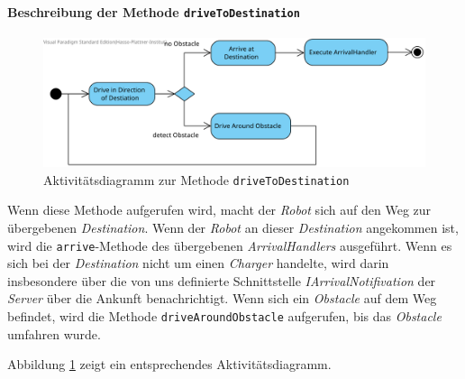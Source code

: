 			\paragraph{Beschreibung der Methode \texttt{driveToDestination}}
			\begin{figure}[H]
			\centering
			\includegraphics[width=1\textwidth]{img/1-Entwurf-7-1-methode_driveAroundObstacle}
			\caption{Aktivitätsdiagramm zur Methode \texttt{driveToDestination}}
			\label{AktivitaetDriveToDestination}
			\end{figure}

			Wenn diese Methode aufgerufen wird, macht der \textit{Robot} sich auf den Weg zur 
			übergebenen \textit{Destination}. Wenn der \textit{Robot} an dieser \textit{Destination} 
			angekommen ist, wird die \texttt{arrive}-Methode des übergebenen \textit{ArrivalHandlers} ausgeführt. Wenn es sich bei der \textit{Destination} nicht um einen \textit{Charger} handelte, wird darin insbesondere über die von uns definierte Schnittstelle \textit{IArrivalNotifivation} der \textit{Server} über die Ankunft benachrichtigt. 
			Wenn sich ein \textit{Obstacle} auf dem Weg befindet, wird die Methode \texttt{driveAroundObstacle} 
			aufgerufen, bis das \textit{Obstacle} umfahren wurde.
			
			Abbildung \ref{AktivitaetDriveToDestination} zeigt ein entsprechendes Aktivitätsdiagramm.

